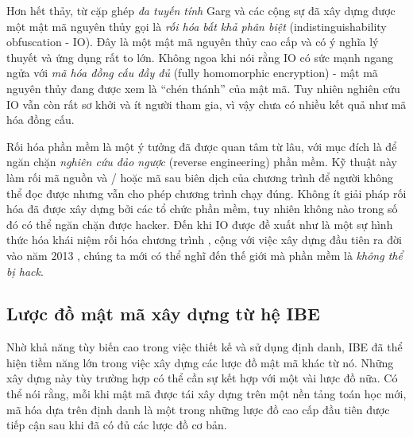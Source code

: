 \documentclass[class=report, crop=false]{standalone}
\begin{document}
			Hơn hết thảy, từ cặp ghép \emph{đa tuyến tính} Garg và các cộng sự \cite{DBLP:conf/focs/GargGH0SW13} đã xây dựng được một mật mã nguyên thủy gọi là \textit{rối hóa bất khả phân biệt} (indistinguishability obfuscation - IO). Đây là một mật mã nguyên thủy cao cấp và có ý nghĩa lý thuyết và ứng dụng rất to lớn. Không ngoa khi nói rằng IO có sức mạnh ngang ngửa với \textit{mã hóa đồng cấu đầy đủ} (fully homomorphic encryption) - mật mã nguyên thủy đang được xem là ``chén thánh'' của mật mã. Tuy nhiên nghiên cứu IO vẫn còn rất sơ khởi và ít người tham gia, vì vậy chưa có nhiều kết quả như mã hóa đồng cấu.
			
			Rối hóa phần mềm là một ý tưởng đã được quan tâm từ lâu, với mục đích là để ngăn chặn \textit{nghiên cứu đảo ngược} (reverse engineering) phần mềm. Kỹ thuật này làm rối mã nguồn và / hoặc mã sau biên dịch của chương trình để người không thể đọc được nhưng vẫn cho phép chương trình chạy đúng. Không ít giải pháp rối hóa đã được xây dựng bởi các tổ chức phần mềm, tuy nhiên không nào trong số đó có thể ngăn chặn được hacker. Đến khi IO được đề xuất như là một sự hình thức hóa khái niệm rối hóa chương trình \cite{DBLP:conf/crypto/BarakGIRSVY01}, cộng với việc xây dựng đầu tiên ra đời vào năm 2013 \cite{DBLP:conf/focs/GargGH0SW13}, chúng ta mới có thể nghĩ đến thế giới mà phần mềm là \emph{không thể bị hack}.
		\subsection{Lược đồ mật mã xây dựng từ hệ IBE}
			Nhờ khả năng tùy biến cao trong việc thiết kế và sử dụng định danh, IBE đã thể hiện tiềm năng lớn trong việc xây dựng các lược đồ mật mã khác từ nó. Những xây dựng này tùy trường hợp có thể cần sự kết hợp với một vài lược đồ nữa. Có thể nói rằng, mỗi khi mật mã được tái xây dựng trên một nền tảng toán học mới, mã hóa dựa trên định danh là một trong những lược đồ cao cấp đầu tiên được tiếp cận sau khi đã có đủ các lược đồ cơ bản.
			\vspace{-\baselineskip}
\end{document}
